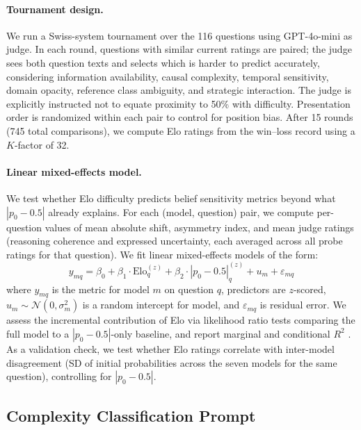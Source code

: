 \documentclass[11pt]{article}
\begin{document}
\paragraph{Tournament design.}
We run a Swiss-system tournament over the 116 questions using GPT-4o-mini as judge.
In each round, questions with similar current ratings are paired; the judge sees both question texts and selects which is harder to predict accurately, considering information availability, causal complexity, temporal sensitivity, domain opacity, reference class ambiguity, and strategic interaction.
The judge is explicitly instructed not to equate proximity to 50\% with difficulty.
Presentation order is randomized within each pair to control for position bias.
After 15 rounds (745 total comparisons), we compute Elo ratings from the win--loss record using a $K$-factor of 32.

\paragraph{Linear mixed-effects model.}
We test whether Elo difficulty predicts belief sensitivity metrics beyond what $|p_0 - 0.5|$ already explains.
For each (model, question) pair, we compute per-question values of mean absolute shift, asymmetry index, and mean judge ratings (reasoning coherence and expressed uncertainty, each averaged across all probe ratings for that question).
We fit linear mixed-effects models of the form:
\begin{equation}
    y_{mq} = \beta_0 + \beta_1 \cdot \text{Elo}_q^{(z)} + \beta_2 \cdot |p_0 - 0.5|_q^{(z)} + u_m + \varepsilon_{mq}
\end{equation}
where $y_{mq}$ is the metric for model $m$ on question $q$, predictors are $z$-scored, $u_m \sim \mathcal{N}(0, \sigma_m^2)$ is a random intercept for model, and $\varepsilon_{mq}$ is residual error.
We assess the incremental contribution of Elo via likelihood ratio tests comparing the full model to a $|p_0 - 0.5|$-only baseline, and report marginal and conditional $R^2$ \cite{nakagawa2013general}.
As a validation check, we test whether Elo ratings correlate with inter-model disagreement (SD of initial probabilities across the seven models for the same question), controlling for $|p_0 - 0.5|$.

%


\subsection{Complexity Classification Prompt}
\label{app:complexity-prompt}
\end{document}
